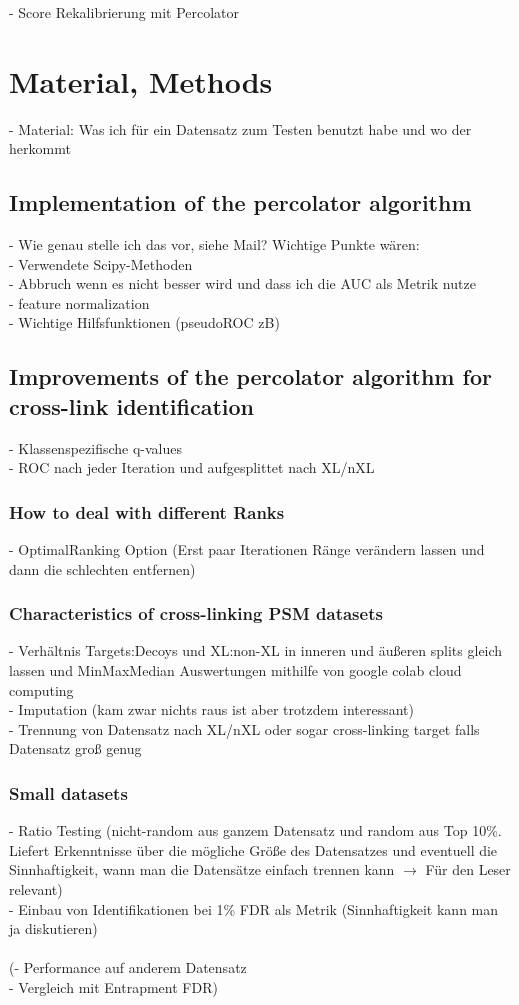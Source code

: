 \documentclass[10pt,a4paper]{article}
\begin{document}
		- Score Rekalibrierung mit Percolator
	\section{Material, Methods}
	
		- Material: Was ich für ein Datensatz zum Testen benutzt habe und wo der herkommt
	
		\subsection{Implementation of the percolator algorithm}
			- Wie genau stelle ich das vor, siehe Mail? Wichtige Punkte wären:\\
			- Verwendete Scipy-Methoden\\
			- Abbruch wenn es nicht besser wird und dass ich die AUC als Metrik nutze\\
			- feature normalization\\
			- Wichtige Hilfsfunktionen (pseudoROC zB)
			
		\subsection{Improvements of the percolator algorithm for cross-link identification}
			- Klassenspezifische q-values\\
			- ROC nach jeder Iteration und aufgesplittet nach XL/nXL\\
			\subsubsection{How to deal with different Ranks}
			- OptimalRanking Option (Erst paar Iterationen Ränge verändern lassen und dann die schlechten entfernen)\\
			\subsubsection{Characteristics of cross-linking PSM datasets}
			- Verhältnis Targets:Decoys und XL:non-XL in inneren und äußeren splits gleich lassen und MinMaxMedian Auswertungen mithilfe von google colab cloud computing\\
			- Imputation (kam zwar nichts raus ist aber trotzdem interessant)\\
			- Trennung von Datensatz nach XL/nXL oder sogar cross-linking target falls Datensatz groß genug\\
			\subsubsection{Small datasets}
			- Ratio Testing (nicht-random aus ganzem Datensatz und random aus Top 10\%. Liefert Erkenntnisse über die mögliche Größe des Datensatzes und eventuell die Sinnhaftigkeit, wann man die Datensätze einfach trennen kann $\rightarrow$ Für den Leser relevant)\\
			- Einbau von Identifikationen bei 1\% FDR als Metrik (Sinnhaftigkeit kann man ja diskutieren)\\\\			
			(- Performance auf anderem Datensatz\\
			- Vergleich mit Entrapment FDR)
			
\end{document}
